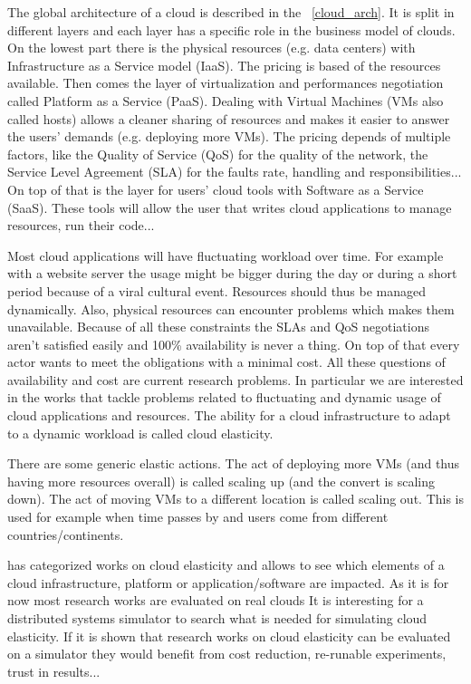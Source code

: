 \documentclass[a4paper]{IEEEtran}
\begin{document}
  The global architecture of a cloud is described in the
  \figurename~\ref{cloud_arch}. It is split in different layers and each layer
  has a specific role in the business model of clouds. On the lowest part there
  is the physical resources (e.g. data centers) with Infrastructure as a Service
  model (IaaS). The pricing is based of the resources available. Then comes the
  layer of virtualization and performances negotiation called Platform as a
  Service (PaaS). Dealing with Virtual Machines (VMs also called hosts) allows a
  cleaner sharing of resources and makes it easier to answer the users' demands
  (e.g. deploying more VMs). The pricing depends of multiple factors, like the
  Quality of Service (QoS) for the quality of the network, the Service Level
  Agreement (SLA) for the faults rate, handling and responsibilities... On top
  of that is the layer for users' cloud tools with Software as a Service (SaaS).
  These tools will allow the user that writes cloud applications to manage
  resources, run their code...
  
  Most cloud applications will have fluctuating workload over time. For example 
  with a website server the usage might be bigger during the day or during a 
  short period because of a viral cultural event. Resources should thus be 
  managed dynamically. Also, physical resources can encounter problems which 
  makes them unavailable. Because of all these constraints the SLAs and QoS 
  negotiations aren't satisfied easily and 100\% availability is never a thing. 
  On top of that every actor wants to meet the obligations with a minimal cost. 
  All these questions of availability and cost are current research problems. 
  In particular we are interested in the works that tackle problems related to 
  fluctuating and dynamic usage of cloud applications and resources. The 
  ability for a cloud infrastructure to adapt to a dynamic workload is called 
  cloud elasticity.
  
  There are some generic elastic actions. The act of deploying more VMs (and
  thus having more resources overall) is called scaling up (and the convert is
  scaling down). The act of moving VMs to a different location is called scaling
  out. This is used for example when time passes by and users come from
  different countries/continents.
  
  \cite{Naskos2016} has categorized works on cloud elasticity and allows to see
  which elements of a cloud infrastructure, platform or application/software are
  impacted. As it is for now most research works are evaluated on real clouds It
  is interesting for a distributed systems simulator to search what is needed
  for simulating cloud elasticity. If it is shown that research works on cloud
  elasticity can be evaluated on a simulator they would benefit from cost
  reduction, re-runable experiments, trust in results...
  
\end{document}
